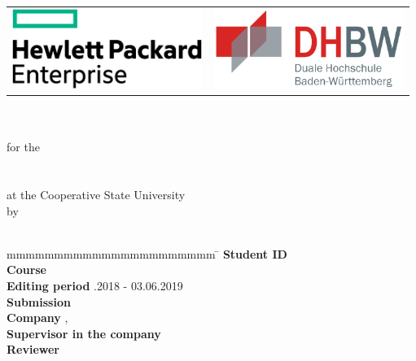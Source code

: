 
\begin{titlepage}
	\begin{longtable}{p{} p{}}
		{\includegraphics[height=2.6cm]{images/hpe.png}} &
		{\includegraphics[height=2.6cm]{images/dhbw.png}}
	\end{longtable}
	\begin{center}
		{\vspace*{12mm}}
		{\LARGE\textbf{\titel}}\\
		\vspace*{4mm}
		\vspace*{12mm}	{\large\textbf{\arbeit}}\\
		\vspace*{8mm}  	for the\\
		\vspace*{3mm} 	{\textbf{\abschluss}}\\
		\vspace*{12mm}	\studiengang\\
		\vspace*{3mm} 	at the Cooperative State University\\
		\vspace*{12mm}	by\\
		\vspace*{3mm} 	{\large\textbf{\autor}}\\
		\vspace*{12mm}
	\end{center}
	\vfill
	\begin{spacing}{1.2}
		\begin{tabbing}
			mmmmmmmmmmmmmmmmmmmmmm     \= \kill
			\textbf{Student ID}  \>  \matrikelnr\\
			\textbf{Course}  \>  \kurs\\
                        \textbf{Editing period}  .2018 - 03.06.2019\\
                        \textbf{Submission} \> \datumAbgabe\\
			\textbf{Company}      \>  \firma, \firmenort\\
			\textbf{Supervisor in the company}              \>  \betreuer\\
			\textbf{Reviewer}              \>  \gutachter
		\end{tabbing}
	\end{spacing}
\end{titlepage}
